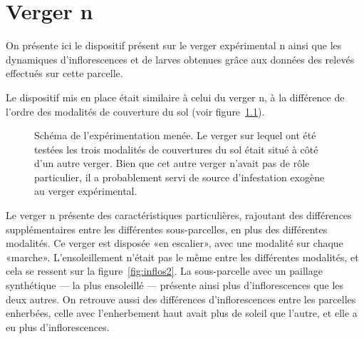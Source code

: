  \chapter{Verger n}
 \label{chap:bloc2}
 
 On présente ici le dispositif présent sur le verger expérimental n ainsi que les dynamiques d'inflorescences et de larves obtenues grâce aux données des relevés effectués sur cette parcelle.
 
 Le dispositif mis en place était similaire à celui du verger n, à la différence de l'ordre des modalités de couverture du sol (voir figure~\ref{fig:schema2}).
 
 \begin{figure}[ht]
 \centering
 
 \caption{Schéma de l'expérimentation menée. Le verger sur lequel ont été testées les trois modalités de couvertures du sol était situé à côté d'un autre verger. Bien que cet autre verger n'avait pas de rôle particulier, il a probablement servi de source d'infestation exogène au verger expérimental.}
 \label{fig:schema2}
\end{figure}
 
 Le verger n présente des caractéristiques particulières, rajoutant des différences supplémentaires entre les différentes sous-parcelles, en plus des différentes modalités.
 Ce verger est disposée «en escalier», avec une modalité sur chaque «marche».
 L'ensoleillement n'était pas le même entre les différentes modalités, et cela se ressent sur la figure~\ref{fig:inflos2}.
 La sous-parcelle avec un paillage synthétique --- la plus ensoleillé --- présente ainsi plus d'inflorescences que les deux autres.
 On retrouve aussi des différences d'inflorescences entre les parcelles enherbées, celle avec l'enherbement haut avait plus de soleil que l'autre, et elle a eu plus d'inflorescences.
 
